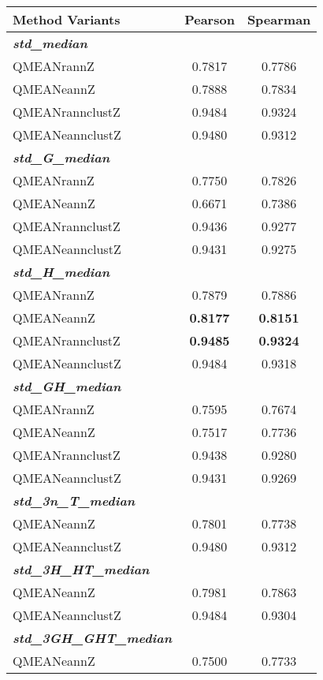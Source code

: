 \begin{table}[htbp]
\center
\begin{tabular}{lcc}
\toprule                %
\textbf{Method Variants} & \textbf{Pearson} & \textbf{Spearman} \\
	\midrule                %
	\emph{\textbf{std\_median}}	& &\\
	QMEANrannZ	&0.7817	&0.7786\\
	QMEANeannZ	&0.7888	&0.7834\\
	QMEANrannclustZ	&0.9484	&0.9324\\
	QMEANeannclustZ	&0.9480	&0.9312\\
	\midrule                %
	\emph{\textbf{std\_G\_median}} 	& &\\
	QMEANrannZ	&0.7750	&0.7826\\
	QMEANeannZ	&0.6671	&0.7386\\
	QMEANrannclustZ	&0.9436	&0.9277\\
	QMEANeannclustZ	&0.9431	&0.9275\\
	\midrule                %
	\emph{\textbf{std\_H\_median}} 	& &\\
	QMEANrannZ	&0.7879	&0.7886\\
	QMEANeannZ	&\textbf{0.8177}	&\textbf{0.8151}\\
	QMEANrannclustZ	&\textbf{0.9485}	&\textbf{0.9324}\\
	QMEANeannclustZ	&0.9484	&0.9318\\
	\midrule                %
	\emph{\textbf{std\_GH\_median}}	& & \\
	QMEANrannZ	&0.7595	&0.7674\\
	QMEANeannZ	&0.7517	&0.7736\\
	QMEANrannclustZ	&0.9438	&0.9280\\
	QMEANeannclustZ	&0.9431	&0.9269\\
	\midrule                %
	\emph{\textbf{std\_3n\_T\_median}}	& &\\
	QMEANeannZ	&0.7801	&0.7738\\
	QMEANeannclustZ	&0.9480	&0.9312\\	
	\midrule                %
	\emph{\textbf{std\_3H\_HT\_median}}	& &\\
	QMEANeannZ	&0.7981	&0.7863\\
	QMEANeannclustZ	&0.9484	&0.9304\\		
	\midrule                %
	\emph{\textbf{std\_3GH\_GHT\_median}}	& &\\
	QMEANeannZ	&0.7500	&0.7733\\

\end{tabular}
\end{table}
